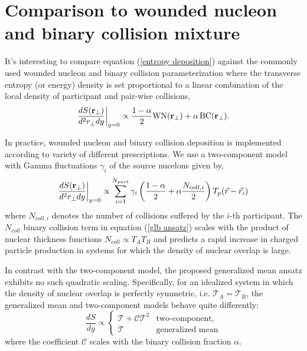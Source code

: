 \documentclass[aps,prl,reprint,amsmath,nofootinbib]{revtex4-1}
\begin{document}
\section{Comparison to wounded nucleon and binary collision mixture}

It's interesting to compare equation (\ref{entropy deposition}) against the commonly used wounded nucleon and binary collision parameterization where the 
transverse entropy (or energy) density is set proportional to a linear combination of the local density of participant and pair-wise collisions,
\begin{equation}
 \label{glb ansatz}
 \frac{dS({\bf r}_\perp)}{d^2r_\perp dy} \biggr \rvert_{y=0}  \propto \frac{1-\alpha}{2}\mbox{WN}({\bf r_\perp}) + \alpha\, \mbox{BC}({\bf r_\perp}). 
\end{equation}

In practice, wounded nucleon and binary collision deposition is implemented according to variety of different prescriptions. We use a two-component model
with Gamma fluctuations $\gamma_i$ of the source nucelons given by,
\begin{equation}
 \label{glb algorithm}
 \frac{dS({\bf r}_\perp)}{d^2r_\perp dy} \biggr \rvert_{y=0}  \propto \sum\limits_{i=1}^{N_{part}} \gamma_i \left(\frac{1-\alpha}{2} + \alpha \frac{N_{coll,i}}{2} \right ) T_p(\vec{r}-\vec{r}_i)
\end{equation}
where $N_{coll,i}$ denotes the number of collisions suffered by the $i$-th participant. The $N_{coll}$ binary collision term in equation (\ref{glb ansatz}) scales with the product of nuclear thickness 
functions $N_{coll} \propto T_A T_B$ and predicts a rapid increase in charged particle production in systems for which the density of nuclear overlap is large.  

In contrast with the two-component model, the proposed generalized mean ansatz exhibits no such quadratic scaling. Specifically, for an idealized system in which the density of nuclear overlap is perfectly symmetric, 
i.e. $\mathcal{T}_A = \mathcal{T}_B$, the generalized mean and two-component models behave quite differently:
\begin{equation}
   \label{symmetric scaling}
   \frac{dS}{dy} \propto
  \begin{cases}
   \mathcal{T} + \mathcal{C} \mathcal{T}^2 & \text{two-component,}\\
   \mathcal{T} & \text{generalized mean}
  \end{cases}
\end{equation}
where the coefficient $\mathcal{C}$ scales with the binary collision fraction $\alpha$.
\end{document}
